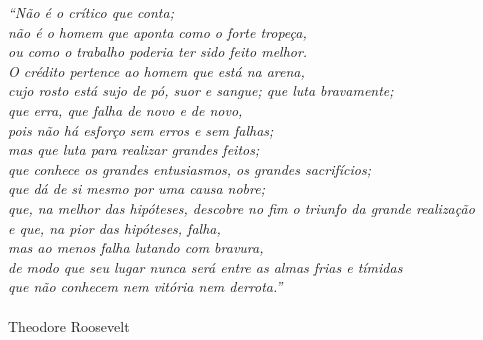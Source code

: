%
%
\begin{epigrafe}
\textit{
``Não é o crítico que conta;\\
não é o homem que aponta como o forte tropeça,\\
ou como o trabalho poderia ter sido feito melhor.\\
O crédito pertence ao homem que está na arena,\\
cujo rosto está sujo de pó, suor e sangue; que luta bravamente;\\
que erra, que falha de novo e de novo,\\ 
pois não há esforço sem erros e sem falhas;\\
mas que luta para realizar grandes feitos;\\
que conhece os grandes entusiasmos, os grandes sacrifícios;\\
que dá de si mesmo por uma causa nobre;\\
que, na melhor das hipóteses, descobre no fim o triunfo da grande realização \\
e que, na pior das hipóteses, falha,\\
mas ao menos falha lutando com bravura,\\
de modo que seu lugar nunca será entre as almas frias e tímidas\\
que não conhecem nem vitória nem derrota.''\\
}
~\\
Theodore Roosevelt
\end{epigrafe}

% 
% 
\begin{abstract}
Um dos principais desafios de sistemas ubíquos e sensíveis a contexto é a coleta de informações relevantes sobre entidades, e o uso destas informações para compreender e prever seu comportamento. Isto permite que as aplicações adaptem-se às entidades, evitando assim uma sobrecarga de questionamentos e informações à entidade. Este trabalho apresenta o eProfile, um modelo que permite que aplicações registrem as ações de entidades em trilhas e infiram informações de perfil a partir destas trilhas, utilizando interoperabilidade semântica e assim permitindo que diferentes aplicações compartilhem informações em um perfil unificado. Foi desenvolvido um protótipo para a avaliação do modelo, o qual foi integrado com dois diferentes softwares. Foi verificado que é possível enriquecer a geração de perfis de aplicações através da integração com o modelo. As contribuições deste modelo são o uso de trilhas para extrair perfis, a geração de perfis dinâmicos, o gerenciamento de regras de inferência e modelos de entidades dinâmicos e a interoperabilidade semântica do modelo.
\end{abstract}


